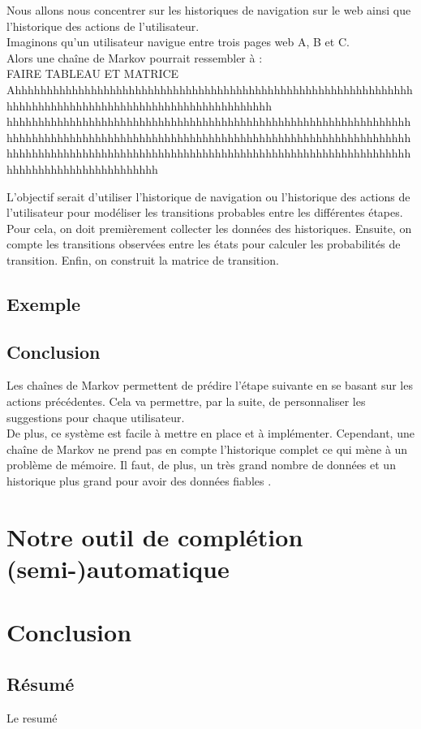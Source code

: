 \documentclass[a4paper, 11pt]{report}
\begin{document}
Nous allons nous concentrer sur les historiques de navigation sur le web ainsi que l'historique des actions de l'utilisateur. \\

Imaginons qu'un utilisateur navigue entre trois pages web A, B et C. \\
Alors une chaîne de Markov pourrait ressembler à : \\

FAIRE TABLEAU ET MATRICE Ahhhhhhhhhhhhhhhhhhhhhhhhhhhhhhhhhhhhhhhhhhhhhhhhhhhhhhhhhhhhhhhhhhhhhhhhhhhhhhhhhhhhhhhhhhhhhhhhhhhhhhhhh hhhhhhhhhhhhhhhhhhhhhhhhhhhhhhhhhhhhhhhhhhhhhhhhhhhhhhhhhhhhhhhhhhhhhhhhhhhhhhhhhhhhhhhhhhhhhhhhhhhhhhhhhhhhhhhhhhhhhhhhhhhhhhhhhhhhhhhhhhhhhhhhhhhhhhhhhhhhhhhhhhhhhhhhhhhhhhhhhhhhhhhhhhhhhhhhhhhhhhhhhhhhhhhhhhhhhhhh

L'objectif serait d'utiliser l'historique de navigation ou l'historique des actions de l'utilisateur pour modéliser les transitions probables entre les différentes étapes. \\
Pour cela, on doit premièrement collecter les données des historiques. Ensuite, on compte les transitions observées entre les états pour calculer les probabilités de transition. Enfin, on construit la matrice de transition. \\

\section{Exemple}

\section{Conclusion}

Les chaînes de Markov permettent de prédire l'étape suivante en se basant sur les actions précédentes. Cela va permettre, par la suite, de personnaliser les suggestions pour chaque utilisateur. \\
De plus, ce système est facile à mettre en place et à implémenter. Cependant, une chaîne de Markov ne prend pas en compte l'historique complet ce qui mène à un problème de mémoire. Il faut, de plus, un très grand nombre de données et un historique plus grand pour avoir des données fiables .
\chapter{Notre outil de complétion (semi-)automatique}

\chapter*{Conclusion}
\newpage
\begin{center}
    \vspace*{\fill} %
    \section*{Résumé}
    \begin{justify}
Le resumé


    \end{justify}
\end{center}
\end{document}
